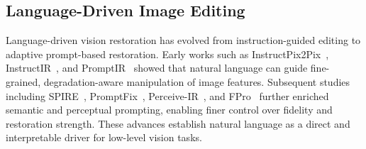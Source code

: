 \subsection{Language-Driven Image Editing}
\noindent Language-driven vision restoration has evolved from instruction-guided editing to adaptive prompt-based restoration. Early works such as InstructPix2Pix~\cite{brooks2023instructpix2pix}, InstructIR~\cite{conde2024instructir}, and PromptIR~\cite{potlapalli2023promptir} showed that natural language can guide fine-grained, degradation-aware manipulation of image features. Subsequent studies including SPIRE~\cite{qi2024spire}, PromptFix~\cite{yu2024promptfix}, Perceive-IR~\cite{zhang2025perceive}, and FPro~\cite{zhou2024fpro} further enriched semantic and perceptual prompting, enabling finer control over fidelity and restoration strength. These advances establish natural language as a direct and interpretable driver for low-level vision tasks.

